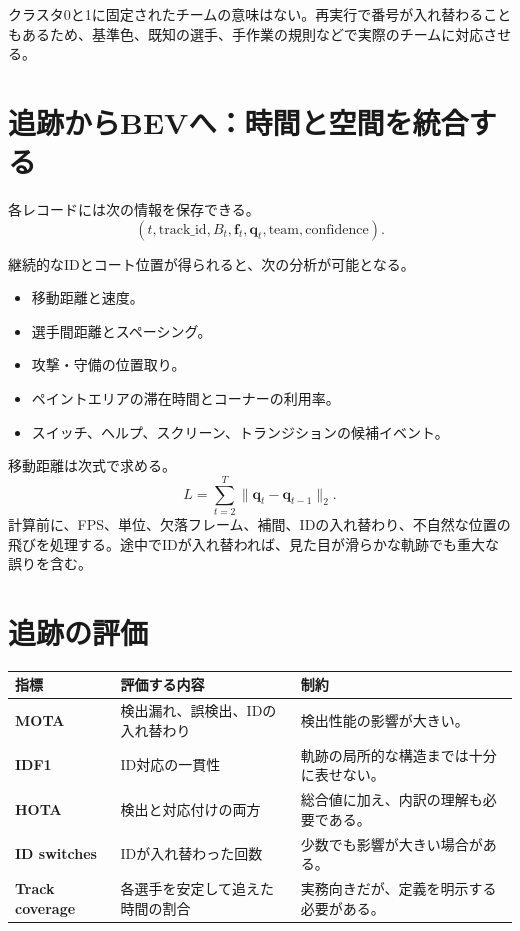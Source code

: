 \documentclass[11pt,a4paper,oneside]{report}
\begin{document}
\begin{riskBox}
クラスタ0と1に固定されたチームの意味はない。再実行で番号が入れ替わることもあるため、基準色、既知の選手、手作業の規則などで実際のチームに対応させる。
\end{riskBox}

\section{追跡からBEVへ：時間と空間を統合する}

各レコードには次の情報を保存できる。
\[
(t,\mathrm{track\_id},B_t,\mathbf f_t,\mathbf q_t,\mathrm{team},\mathrm{confidence}).
\]

継続的なIDとコート位置が得られると、次の分析が可能となる。

\begin{itemize}
  \item 移動距離と速度。
  \item 選手間距離とスペーシング。
  \item 攻撃・守備の位置取り。
  \item ペイントエリアの滞在時間とコーナーの利用率。
  \item スイッチ、ヘルプ、スクリーン、トランジションの候補イベント。
\end{itemize}

移動距離は次式で求める。
\[
L=\sum_{t=2}^{T}\|\mathbf q_t-\mathbf q_{t-1}\|_2.
\]
計算前に、FPS、単位、欠落フレーム、補間、IDの入れ替わり、不自然な位置の飛びを処理する。途中でIDが入れ替われば、見た目が滑らかな軌跡でも重大な誤りを含む。

\section{追跡の評価}
\begingroup\small

\begin{tabularx}{\textwidth}{>{\bfseries\RaggedRight}p{2.7cm} Y Y}
\toprule
指標 & 評価する内容 & 制約 \\
\midrule
MOTA & 検出漏れ、誤検出、IDの入れ替わり & 検出性能の影響が大きい。\\
IDF1 & ID対応の一貫性 & 軌跡の局所的な構造までは十分に表せない。\\
HOTA & 検出と対応付けの両方 & 総合値に加え、内訳の理解も必要である。\\
ID switches & IDが入れ替わった回数 & 少数でも影響が大きい場合がある。\\
Track coverage & 各選手を安定して追えた時間の割合 & 実務向きだが、定義を明示する必要がある。\\
\bottomrule
\end{tabularx}
\end{document}

